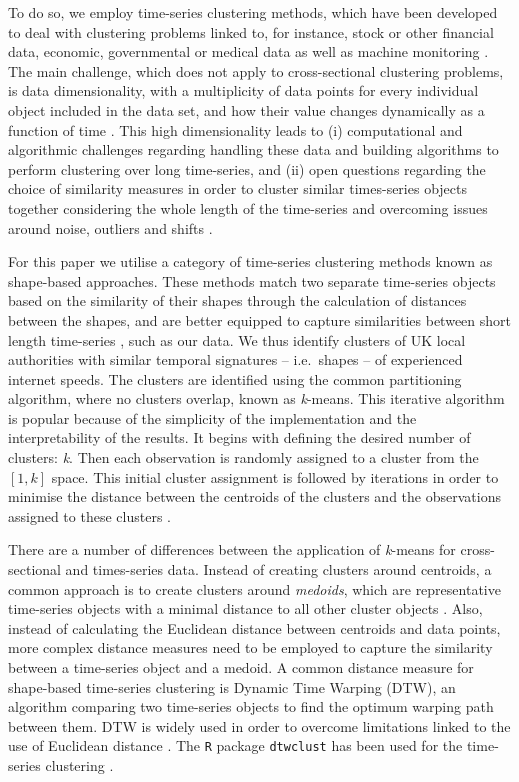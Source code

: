 \documentclass[]{interact}
\theoremstyle{plain}%
\theoremstyle{definition}
\theoremstyle{remark}
\begin{document}
To do so, we employ time-series clustering methods, which have been
developed to deal with clustering problems linked to, for instance,
stock or other financial data, economic, governmental or medical data as
well as machine monitoring
\citep{aggarwal2013time, aggarwal2001surprising, hyndman2015large, WARRENLIAO20051857}.
The main challenge, which does not apply to cross-sectional clustering
problems, is data dimensionality, with a multiplicity of data points for
every individual object included in the data set, and how their value
changes dynamically as a function of time \citep{aghabozorgi2015time}.
This high dimensionality leads to (i) computational and algorithmic
challenges regarding handling these data and building algorithms to
perform clustering over long time-series, and (ii) open questions
regarding the choice of similarity measures in order to cluster similar
times-series objects together considering the whole length of the
time-series and overcoming issues around noise, outliers and shifts
\citep{lin2004iterative, aghabozorgi2015time}.

For this paper we utilise a category of time-series clustering methods
known as shape-based approaches. These methods match two separate
time-series objects based on the similarity of their shapes through the
calculation of distances between the shapes, and are better equipped to
capture similarities between short length time-series
\citep{aghabozorgi2015time}, such as our data. We thus identify clusters
of UK local authorities with similar temporal signatures -- i.e.~shapes
-- of experienced internet speeds. The clusters are identified using the
common partitioning algorithm, where no clusters overlap, known as
\emph{k}-means. This iterative algorithm is popular because of the
simplicity of the implementation and the interpretability of the
results. It begins with defining the desired number of clusters:
\emph{k}. Then each observation is randomly assigned to a cluster from
the \([1,k]\) space. This initial cluster assignment is followed by
iterations in order to minimise the distance between the centroids of
the clusters and the observations assigned to these clusters
\citep{james2013introduction}.

There are a number of differences between the application of
\emph{k}-means for cross-sectional and times-series data. Instead of
creating clusters around centroids, a common approach is to create
clusters around \emph{medoids}, which are representative time-series
objects with a minimal distance to all other cluster objects
\citep{sardatime}. Also, instead of calculating the Euclidean distance
between centroids and data points, more complex distance measures need
to be employed to capture the similarity between a time-series object
and a medoid. A common distance measure for shape-based time-series
clustering is Dynamic Time Warping (DTW), an algorithm comparing two
time-series objects to find the optimum warping path between them. DTW
is widely used in order to overcome limitations linked to the use of
Euclidean distance
\citep{sardatime, berndt1994using, ratanamahatana2004everything}. The
\texttt{R} package \texttt{dtwclust} has been used for the time-series
clustering \citep{dtwclust}.
\end{document}
